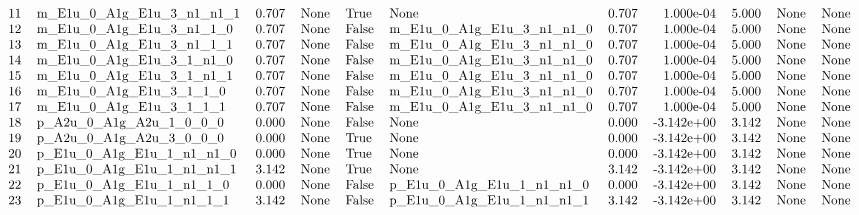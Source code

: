 \documentclass[letterpaper,table,10pt,english]{jupyterBook}
\begin{document}
\begin{figure}[htbp]
\begin{equation*}
\begin{split}
\begin{tabular}{llrlllrrrll}
11 &  m\_E1u\_0\_A1g\_E1u\_3\_n1\_n1\_1 &  0.707 &   None &   True &                       None &       0.707 &  1.000e-04 &  5.000 &       None &   None \\
12 &   m\_E1u\_0\_A1g\_E1u\_3\_n1\_1\_0 &  0.707 &   None &  False &  m\_E1u\_0\_A1g\_E1u\_3\_n1\_n1\_0 &       0.707 &  1.000e-04 &  5.000 &       None &   None \\
13 &   m\_E1u\_0\_A1g\_E1u\_3\_n1\_1\_1 &  0.707 &   None &  False &  m\_E1u\_0\_A1g\_E1u\_3\_n1\_n1\_0 &       0.707 &  1.000e-04 &  5.000 &       None &   None \\
14 &   m\_E1u\_0\_A1g\_E1u\_3\_1\_n1\_0 &  0.707 &   None &  False &  m\_E1u\_0\_A1g\_E1u\_3\_n1\_n1\_0 &       0.707 &  1.000e-04 &  5.000 &       None &   None \\
15 &   m\_E1u\_0\_A1g\_E1u\_3\_1\_n1\_1 &  0.707 &   None &  False &  m\_E1u\_0\_A1g\_E1u\_3\_n1\_n1\_0 &       0.707 &  1.000e-04 &  5.000 &       None &   None \\
16 &    m\_E1u\_0\_A1g\_E1u\_3\_1\_1\_0 &  0.707 &   None &  False &  m\_E1u\_0\_A1g\_E1u\_3\_n1\_n1\_0 &       0.707 &  1.000e-04 &  5.000 &       None &   None \\
17 &    m\_E1u\_0\_A1g\_E1u\_3\_1\_1\_1 &  0.707 &   None &  False &  m\_E1u\_0\_A1g\_E1u\_3\_n1\_n1\_0 &       0.707 &  1.000e-04 &  5.000 &       None &   None \\
18 &    p\_A2u\_0\_A1g\_A2u\_1\_0\_0\_0 &  0.000 &   None &  False &                       None &       0.000 & -3.142e+00 &  3.142 &       None &   None \\
19 &    p\_A2u\_0\_A1g\_A2u\_3\_0\_0\_0 &  0.000 &   None &   True &                       None &       0.000 & -3.142e+00 &  3.142 &       None &   None \\
20 &  p\_E1u\_0\_A1g\_E1u\_1\_n1\_n1\_0 &  0.000 &   None &   True &                       None &       0.000 & -3.142e+00 &  3.142 &       None &   None \\
21 &  p\_E1u\_0\_A1g\_E1u\_1\_n1\_n1\_1 &  3.142 &   None &   True &                       None &       3.142 & -3.142e+00 &  3.142 &       None &   None \\
22 &   p\_E1u\_0\_A1g\_E1u\_1\_n1\_1\_0 &  0.000 &   None &  False &  p\_E1u\_0\_A1g\_E1u\_1\_n1\_n1\_0 &       0.000 & -3.142e+00 &  3.142 &       None &   None \\
23 &   p\_E1u\_0\_A1g\_E1u\_1\_n1\_1\_1 &  3.142 &   None &  False &  p\_E1u\_0\_A1g\_E1u\_1\_n1\_n1\_1 &       3.142 & -3.142e+00 &  3.142 &       None &   None \\

\end{tabular}
\end{split}
\end{equation*}
\end{figure}
\end{document}
